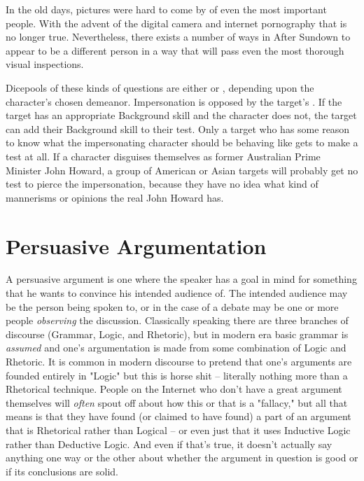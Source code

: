 In the old days, pictures were hard to come by of even the most important people. With the advent of the digital camera and internet pornography that is no longer true. Nevertheless, there exists a number of ways in After Sundown to appear to be a different person in a way that will pass even the most thorough visual inspections.

Dicepools of these kinds of questions are either  or , depending upon the character's chosen demeanor. Impersonation is opposed by the target's . If the target has an appropriate Background skill and the character does not, the target can add their Background skill to their test. Only a target who has some reason to know what the impersonating character should be behaving like gets to make a test at all. If a character disguises themselves as former Australian Prime Minister John Howard, a group of American or Asian targets will probably get no test to pierce the impersonation, because they have no idea what kind of mannerisms or opinions the real John Howard has.

\section{Persuasive Argumentation} 

A persuasive argument is one where the speaker has a goal in mind for something that he wants to convince his intended audience of. The intended audience may be the person being spoken to, or in the case of a debate may be one or more people \textit{observing} the discussion. Classically speaking there are three branches of discourse (Grammar, Logic, and Rhetoric), but in modern era basic grammar is \textit{assumed} and one's argumentation is made from some combination of Logic and Rhetoric. It is common in modern discourse to pretend that one's arguments are founded entirely in "Logic" but this is horse shit -- literally nothing more than a Rhetorical technique. People on the Internet who don't have a great argument themselves will \textit{often} spout off about how this or that is a "fallacy," but all that means is that they have found (or claimed to have found) a part of an argument that is Rhetorical rather than Logical -- or even just that it uses Inductive Logic rather than Deductive Logic. And even if that's true, it doesn't actually say anything one way or the other about whether the argument in question is good or if its conclusions are solid.

